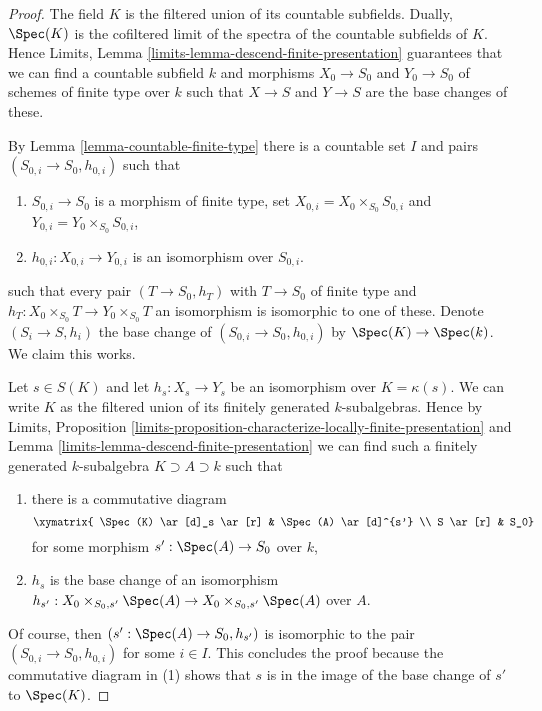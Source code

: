 \begin{proof}
The field $K$ is the filtered union of its countable subfields.
Dually, $\Spec(K)$ is the cofiltered limit of the spectra
of the countable subfields of $K$.
Hence Limits, Lemma \ref{limits-lemma-descend-finite-presentation}
guarantees that we can find a countable subfield
$k$ and morphisms $X_0 \to S_0$ and $Y_0 \to S_0$
of schemes of finite type over $k$ such that
$X \to S$ and $Y \to S$ are the base changes of these.

\medskip\noindent
By Lemma \ref{lemma-countable-finite-type} there is a countable set $I$ and
pairs $(S_{0, i} \to S_0, h_{0, i})$ such that
\begin{enumerate}
\item $S_{0, i} \to S_0$ is a morphism of finite type, set
$X_{0, i} = X_0 \times_{S_0} S_{0, i}$ and
$Y_{0, i} = Y_0 \times_{S_0} S_{0, i}$,
\item $h_{0, i} : X_{0, i} \to Y_{0, i}$ is an isomorphism over $S_{0, i}$.
\end{enumerate}
such that every pair $(T \to S_0, h_T)$ with $T \to S_0$ of finite type
and $h_T : X_0 \times_{S_0} T \to Y_0 \times_{S_0} T$ an isomorphism
is isomorphic to one of these.
Denote $(S_i \to S, h_i)$ the base change of $(S_{0, i} \to S_0, h_{0, i})$
by $\Spec(K) \to \Spec(k)$.
We claim this works.

\medskip\noindent
Let $s \in S(K)$ and let $h_s : X_s \to Y_s$ be an isomorphism over
$K = \kappa(s)$. We can write $K$ as the filtered union of its
finitely generated $k$-subalgebras. Hence by
Limits, Proposition
\ref{limits-proposition-characterize-locally-finite-presentation} and
Lemma \ref{limits-lemma-descend-finite-presentation}
we can find such a finitely generated $k$-subalgebra
$K \supset A \supset k$ such that
\begin{enumerate}
\item there is a commutative diagram
$$
\xymatrix{
\Spec(K) \ar[d]_s \ar[r] &
\Spec(A) \ar[d]^{s'} \\
S \ar[r] &
S_0}
$$
for some morphism $s' : \Spec(A) \to S_0$ over $k$,
\item $h_s$ is the base change of an isomorphism
$h_{s'} : X_0 \times_{S_0, s'} \Spec(A) \to
X_0 \times_{S_0, s'} \Spec(A)$ over $A$.
\end{enumerate}
Of course, then $(s' : \Spec(A) \to S_0, h_{s'})$ is isomorphic
to the pair $(S_{0, i} \to S_0, h_{0, i})$ for some $i \in I$.
This concludes the proof because the commutative diagram
in (1) shows that $s$ is in the image of
the base change of $s'$ to $\Spec(K)$.
\end{proof}

